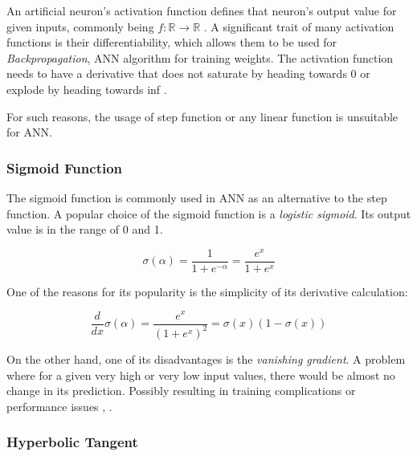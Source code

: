 An artificial neuron's activation function defines that neuron's output value for given inputs, commonly being ${f: \mathbb{R} \rightarrow \mathbb{R}}$ \cite{leskovec2020mining}. A significant trait of many activation functions is their differentiability, which allows them to be used for \textit{Backpropagation}, ANN algorithm for training weights. The activation function needs to have a derivative that does not saturate by heading towards 0 or explode by heading towards inf \cite{matous}.

For such reasons, the usage of step function or any linear function is unsuitable for ANN.
\subsubsection{Sigmoid Function}
The sigmoid function is commonly used in ANN as an alternative to the step function. A popular choice of the sigmoid function is a \textit{logistic sigmoid}. Its output value is in the range of 0 and 1.

\begin{equation}
    {\sigma(\alpha) = \frac{1}{1 + e^{-\alpha}} = \frac{e^x}{1 + e^{x}}}
\end{equation}




One of the reasons for its popularity is the simplicity of its derivative calculation:

\begin{equation}
    {\frac{d}{dx}\sigma(\alpha) = \frac{e^x}{(1 + e^{x})^2} = \sigma(x)(1-\sigma(x))}
\end{equation}


On the other hand, one of its disadvantages is the \textit{vanishing gradient}. A problem where for a given very high or very low input values, there would be almost no change in its prediction. Possibly resulting in training complications or performance issues \cite{7typesactivationfunctions}, \cite{matous}.


\subsubsection{Hyperbolic Tangent}

